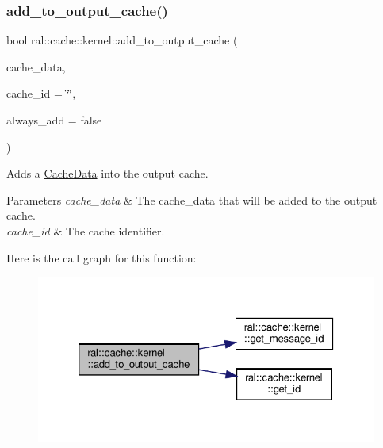 \subsubsection{\texorpdfstring{add\+\_\+to\+\_\+output\+\_\+cache()}{add\_to\_output\_cache()}\hspace{0.1cm}{\footnotesize\ttfamily [2/3]}}
{\footnotesize\ttfamily bool ral\+::cache\+::kernel\+::add\+\_\+to\+\_\+output\+\_\+cache (\begin{DoxyParamCaption}\item[{std\+::unique\+\_\+ptr$<$ \hyperlink{classral_1_1cache_1_1CacheData}{ral\+::cache\+::\+Cache\+Data} $>$}]{cache\+\_\+data,  }\item[{std\+::string}]{cache\+\_\+id = {\ttfamily \char`\"{}\char`\"{}},  }\item[{bool}]{always\+\_\+add = {\ttfamily false} }\end{DoxyParamCaption})}



Adds a \hyperlink{classral_1_1cache_1_1CacheData}{Cache\+Data} into the output cache. 


\begin{DoxyParams}{Parameters}
{\em cache\+\_\+data} & The cache\+\_\+data that will be added to the output cache. \\
\hline
{\em cache\+\_\+id} & The cache identifier. \\
\hline
\end{DoxyParams}
Here is the call graph for this function\+:\nopagebreak
\begin{figure}[H]
\begin{center}
\leavevmode
\includegraphics[width=326pt]{classral_1_1cache_1_1kernel_ad8cd102392bbece14178c0ebf9f0c6bc_cgraph}
\end{center}
\end{figure}
\mbox{\label{classral_1_1cache_1_1kernel_a94e93c7bb81d9a3a7729fa84a7cf07c1}} 

